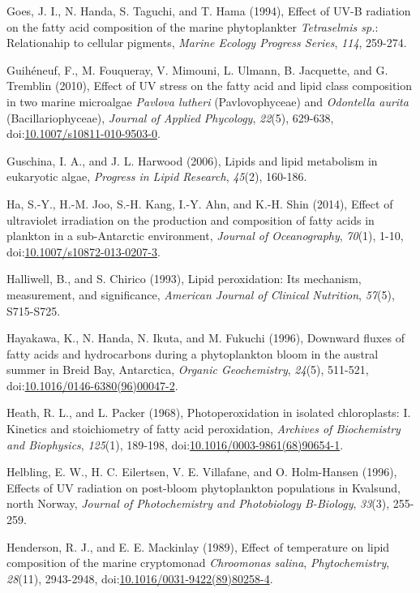 \begin{singlespace}
{{Goes, J. I., N. Handa, S. Taguchi, and T. Hama (1994), Effect of UV-B radiation on the fatty acid composition of the marine phytoplankter \emph{Tetraselmis sp.}: Relationahip to cellular pigments, \emph{Marine Ecology Progress Series}, \emph{114}, 259-274.

Guih\'{e}neuf, F., M. Fouqueray, V. Mimouni, L. Ulmann, B. Jacquette, and G. Tremblin (2010), Effect of UV stress on the fatty acid and lipid class composition in two marine microalgae \emph{Pavlova lutheri} (Pavlovophyceae) and \emph{Odontella aurita} (Bacillariophyceae), \emph{Journal of Applied Phycology}, \emph{22}(5), 629-638, doi:\href{http://dx.doi.org/10.1007/s10811-010-9503-0}{10.1007/s10811-010-9503-0}.

Guschina, I. A., and J. L. Harwood (2006), Lipids and lipid metabolism in eukaryotic algae, \emph{Progress in Lipid Research}, \emph{45}(2), 160-186.

Ha, S.-Y., H.-M. Joo, S.-H. Kang, I.-Y. Ahn, and K.-H. Shin (2014), Effect of ultraviolet irradiation on the production and composition of fatty acids in plankton in a sub-Antarctic environment, \emph{Journal of Oceanography}, \emph{70}(1), 1-10, doi:\href{http://dx.doi.org/10.1007/s10872-013-0207-3}{10.1007/s10872-013-0207-3}.

Halliwell, B., and S. Chirico (1993), Lipid peroxidation: Its mechanism, measurement, and significance, \emph{American Journal of Clinical Nutrition}, \emph{57}(5), S715-S725.

Hayakawa, K., N. Handa, N. Ikuta, and M. Fukuchi (1996), Downward fluxes of fatty acids and hydrocarbons during a phytoplankton bloom in the austral summer in Breid Bay, Antarctica, \emph{Organic Geochemistry}, \emph{24}(5), 511-521, doi:\href{http://dx.doi.org/10.1016/0146-6380(96)00047-2}{10.1016/0146-6380(96)00047-2}.

Heath, R. L., and L. Packer (1968), Photoperoxidation in isolated chloroplasts: I. Kinetics and stoichiometry of fatty acid peroxidation, \emph{Archives of Biochemistry and Biophysics}, \emph{125}(1), 189-198, doi:\href{http://dx.doi.org/10.1016/0003-9861(68)90654-1}{10.1016/0003-9861(68)90654-1}.

Helbling, E. W., H. C. Eilertsen, V. E. Villafane, and O. Holm-Hansen (1996), Effects of UV radiation on post-bloom phytoplankton populations in Kvalsund, north Norway, \emph{Journal of Photochemistry and Photobiology B-Biology}, \emph{33}(3), 255-259.

Henderson, R. J., and E. E. Mackinlay (1989), Effect of temperature on lipid composition of the marine cryptomonad \emph{Chroomonas salina}, \emph{Phytochemistry}, \emph{28}(11), 2943-2948, doi:\href{http://dx.doi.org/10.1016/0031-9422(89)80258-4}{10.1016/0031-9422(89)80258-4}.

}}
\end{singlespace}
